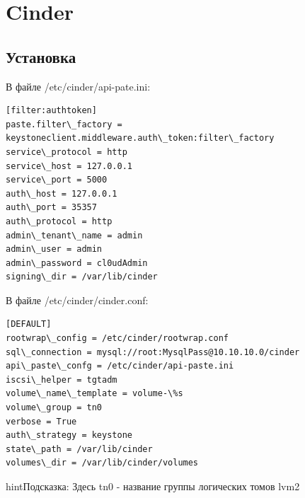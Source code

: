 \documentclass[letterpaper,10pt,russian]{sphinxmanual}
\begin{document}
\chapter{Cinder}
\label{README:cinder}\label{README:id15}

\section{Установка}
\label{README:id16}





В файле /etc/cinder/api-pate.ini:

\begin{Verbatim}[commandchars=\\\{\}]
[filter:authtoken]
paste.filter\_factory = keystoneclient.middleware.auth\_token:filter\_factory
service\_protocol = http
service\_host = 127.0.0.1
service\_port = 5000
auth\_host = 127.0.0.1
auth\_port = 35357
auth\_protocol = http
admin\_tenant\_name = admin
admin\_user = admin
admin\_password = cl0udAdmin
signing\_dir = /var/lib/cinder
\end{Verbatim}

В файле /etc/cinder/cinder.conf:

\begin{Verbatim}[commandchars=\\\{\}]
[DEFAULT]
rootwrap\_config = /etc/cinder/rootwrap.conf
sql\_connection = mysql://root:MysqlPass@10.10.10.0/cinder
api\_paste\_confg = /etc/cinder/api-paste.ini
iscsi\_helper = tgtadm
volume\_name\_template = volume-\%s
volume\_group = tn0
verbose = True
auth\_strategy = keystone
state\_path = /var/lib/cinder
volumes\_dir = /var/lib/cinder/volumes
\end{Verbatim}

\begin{notice}{hint}{Подсказка:}
Здесь tn0 - название группы логических томов lvm2
\end{notice}



\end{document}
